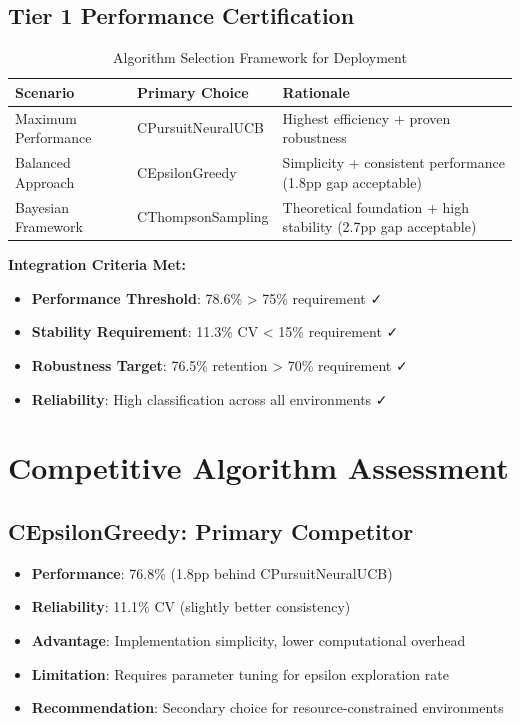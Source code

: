 \documentclass[12pt,a4paper]{article}
\newcommand{\success}[1]{\textcolor{accentgreen}{\textbf{#1}}}
\newcommand{\warning}[1]{\textcolor{warningred}{\textbf{#1}}}
\begin{document}
\subsection{Tier 1 Performance Certification}

\begin{table}[H]
\centering
\caption{Algorithm Selection Framework for Deployment}
\begin{tabular}{@{}lll@{}}
\toprule
\textbf{Scenario} & \textbf{Primary Choice} & \textbf{Rationale} \\
\midrule
Maximum Performance & CPursuitNeuralUCB & Highest efficiency + proven robustness \\
Balanced Approach & CEpsilonGreedy & Simplicity + consistent performance (1.8pp gap acceptable) \\
Bayesian Framework & CThompsonSampling & Theoretical foundation + high stability (2.7pp gap acceptable) \\
\bottomrule
\end{tabular}
\end{table}

\textbf{Integration Criteria Met:}
\begin{itemize}
\item \success{Performance Threshold}: 78.6\% > 75\% requirement ✓
\item \success{Stability Requirement}: 11.3\% CV < 15\% requirement ✓
\item \success{Robustness Target}: 76.5\% retention > 70\% requirement ✓
\item \success{Reliability}: High classification across all environments ✓
\end{itemize}

\section{Competitive Algorithm Assessment}

\subsection{CEpsilonGreedy: Primary Competitor}

\begin{itemize}
\item \textbf{Performance}: 76.8\% (1.8pp behind CPursuitNeuralUCB)
\item \textbf{Reliability}: 11.1\% CV (slightly better consistency)
\item \textbf{Advantage}: Implementation simplicity, lower computational overhead
\item \warning{Limitation}: Requires parameter tuning for epsilon exploration rate
\item \textbf{Recommendation}: Secondary choice for resource-constrained environments
\end{itemize}
\end{document}
